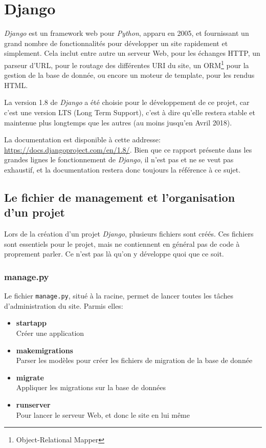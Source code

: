 \documentclass[a4paper]{report}
\begin{document}
\section{Django}
\label{sec:django}
\par \emph{Django}  est un framework web pour \emph{Python}, apparu en 2005, et fournissant un grand nombre de fonctionnalités pour
développer un site rapidement et simplement. Cela inclut entre autre un serveur Web, pour les échanges HTTP, un parseur
d'URL, pour le routage des différentes URI du site, un ORM\footnote{Object-Relational Mapper} pour la gestion de la base
de donnée, ou encore un moteur de template, pour les rendus HTML.
\par La version 1.8 de \emph{Django} a été choisie pour le développement de ce projet, car c'est une version LTS (Long Term
Support), c'est à dire qu'elle restera stable et maintenue plus longtemps que les autres (au moins jusqu'en Avril 2018).
\par La documentation est disponible à cette addresse: \url{https://docs.djangoproject.com/en/1.8/}. Bien que ce rapport
présente dans les grandes lignes le fonctionnement de \emph{Django}, il n'est pas et ne se veut pas exhaustif, et la
documentation restera donc toujours la référence à ce sujet.

\subsection{Le fichier de management et l'organisation d'un projet}
\label{sub:Le fichier de management et l'organisation d'un projet}

\par Lors de la création d'un projet \emph{Django}, plusieurs fichiers sont créés. Ces fichiers sont essentiels pour le projet,
mais ne contiennent en général pas de code à proprement parler. Ce n'est pas là qu'on y développe quoi que ce soit.

\subsubsection{manage.py}
\label{ssub:manage.py}

\par Le fichier \verb-manage.py-, situé à la racine, permet de lancer toutes les tâches d'administration du site. Parmis
elles:
\begin{itemize}
    \item \textbf{startapp} \\
        Créer une application
    \item \textbf{makemigrations} \\
        Parser les modèles pour créer les fichiers de migration de la base de donnée
    \item \textbf{migrate} \\
        Appliquer les migrations sur la base de données
    \item \textbf{runserver} \\
        Pour lancer le serveur Web, et donc le site en lui même
\end{itemize}
\end{document}
